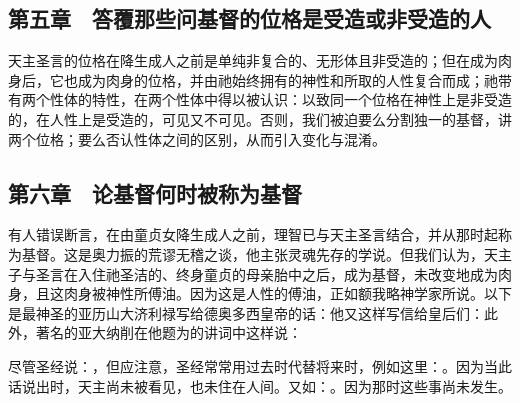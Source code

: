 
\subsection{第五章　答覆那些问基督的位格是受造或非受造的人}

天主圣言的位格在降生成人之前是单纯非复合的、无形体且非受造的；但在成为肉身后，它也成为肉身的位格，并由祂始终拥有的神性和所取的人性复合而成；祂带有两个性体的特性，在两个性体中得以被认识：以致同一个位格在神性上是非受造的，在人性上是受造的，可见又不可见。否则，我们被迫要么分割独一的基督，讲两个位格；要么否认性体之间的区别，从而引入变化与混淆。\par


\subsection{第六章　论基督何时被称为基督}

有人错误断言，在由童贞女降生成人之前，理智已与天主圣言结合，并从那时起称为基督。这是奥力振的荒谬无稽之谈，他主张灵魂先存的学说。但我们认为，天主子与圣言在入住祂圣洁的、终身童贞的母亲胎中之后，成为基督，未改变地成为肉身，且这肉身被神性所傅油。因为这是人性的傅油，正如额我略神学家所说。以下是最神圣的亚历山大济利禄写给德奥多西皇帝的话：他又这样写信给皇后们：此外，著名的亚大纳削在他题为的讲词中这样说：\par

尽管圣经说：，但应注意，圣经常常用过去时代替将来时，例如这里：。因为当此话说出时，天主尚未被看见，也未住在人间。又如：。因为那时这些事尚未发生。\par

